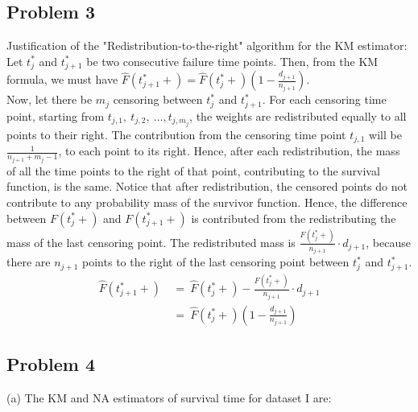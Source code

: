\documentclass[11pt]{extarticle} %
\begin{document}
\subsection*{Problem 3}
\noindent
Justification of the "Redistribution-to-the-right" algorithm for the KM estimator:\\
Let $t_j^*$ and $t_{j+1}^*$ be two consecutive failure time points. Then, from the KM formula, we must have $\hat{F}(t^*_{j+1}+) = \hat{F}(t^*_{j}+)\left(1 - \frac{d_{j+1}}{n_{j+1}}\right)$. \\
Now, let there be $m_j$ censoring between $t^*_j$ and $t^*_{j+1}$. For each censoring time point, starting from $t_{j,1},\ t_{j,2},\ \dots, t_{j,m_j}$, the weights are redistributed equally to all points to their right. The contribution from the censoring time point $t_{j,1}$ will be $\frac{1}{n_{j+1} + m_j - 1}$, to each point to its right. Hence, after each redistribution, the mass of all the time points to the right of that point, contributing to the survival function, is the same. Notice that after redistribution, the censored points do not contribute to any probability mass of the survivor function. Hence, the difference between $F(t^*_j +)$ and $F(t^*_{j+1} +)$ is contributed from the redistributing the mass of the last censoring point. The redistributed mass is $\frac{F(t^*_{j} +)}{n_{j+1}}\cdot d_{j+1}$, because there are $n_{j+1}$ points to the right of the last censoring point between $t^*_j$ and $t^*_{j+1}$.
\begin{align*}
\hat{F}(t^*_{j+1}+)\ &{=}\ \hat{F}(t^*_{j}+) - \frac{F(t^*_{j} +)}{n_{j+1}}\cdot d_{j+1}  \\
\ &{=}\ \hat{F}(t^*_{j}+)\left(1 - \frac{d_{j+1}}{n_{j+1}}\right)
\end{align*}

\subsection*{Problem 4}
\noindent
(a) The KM and NA estimators of survival time for dataset I are:
\end{document}

